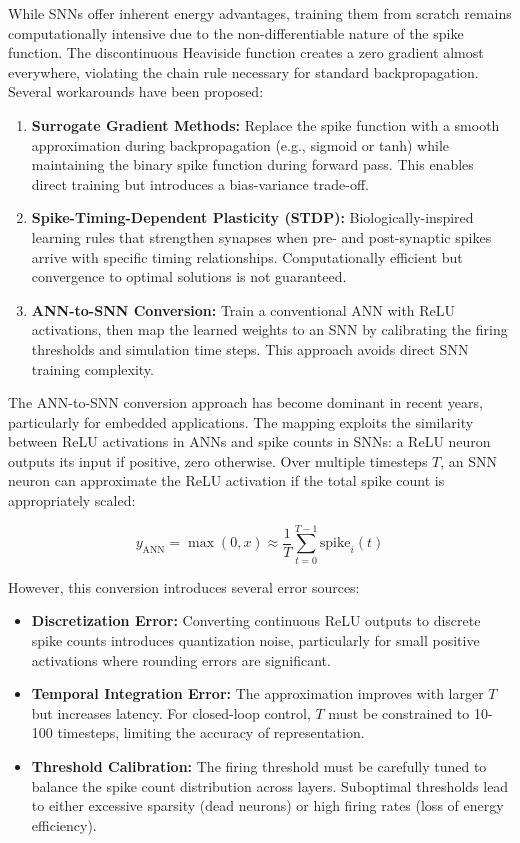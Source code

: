 While SNNs offer inherent energy advantages, training them from scratch remains computationally intensive 
due to the non-differentiable nature of the spike function. The discontinuous Heaviside function creates a 
zero gradient almost everywhere, violating the chain rule necessary for standard backpropagation. Several 
workarounds have been proposed:

\begin{enumerate}
    \item \textbf{Surrogate Gradient Methods:} Replace the spike function with a smooth approximation during 
    backpropagation (e.g., sigmoid or tanh) while maintaining the binary spike function during forward pass. 
    This enables direct training but introduces a bias-variance trade-off.
    
    \item \textbf{Spike-Timing-Dependent Plasticity (STDP):} Biologically-inspired learning rules that 
    strengthen synapses when pre- and post-synaptic spikes arrive with specific timing relationships. 
    Computationally efficient but convergence to optimal solutions is not guaranteed.
    
    \item \textbf{ANN-to-SNN Conversion:} Train a conventional ANN with ReLU activations, then map the 
    learned weights to an SNN by calibrating the firing thresholds and simulation time steps. This approach 
    avoids direct SNN training complexity.
\end{enumerate}

The ANN-to-SNN conversion approach has become dominant in recent years, particularly for embedded applications. 
The mapping exploits the similarity between ReLU activations in ANNs and spike counts in SNNs: a ReLU neuron 
outputs its input if positive, zero otherwise. Over multiple timesteps $T$, an SNN neuron can approximate the 
ReLU activation if the total spike count is appropriately scaled:

$$y_{\text{ANN}} = \max(0, x) \approx \frac{1}{T} \sum_{t=0}^{T-1} \text{spike}_i(t)$$

However, this conversion introduces several error sources:

\begin{itemize}
    \item \textbf{Discretization Error:} Converting continuous ReLU outputs to discrete spike counts introduces quantization noise, 
    particularly for small positive activations where rounding errors are significant.
    
    \item \textbf{Temporal Integration Error:} The approximation improves with larger $T$ but increases latency. 
    For closed-loop control, $T$ must be constrained to 10-100 timesteps, limiting the accuracy of representation.
    
    \item \textbf{Threshold Calibration:} The firing threshold must be carefully tuned to balance the spike count 
    distribution across layers. Suboptimal thresholds lead to either excessive sparsity (dead neurons) or high firing 
    rates (loss of energy efficiency).
\end{itemize}

